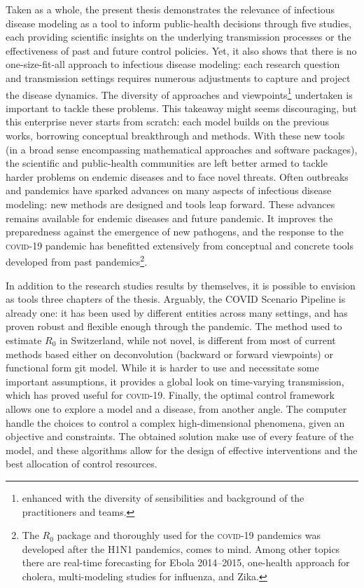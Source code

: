 Taken as a whole, the present thesis demonstrates the relevance of infectious disease modeling as a tool to inform public-health decisions through five studies, each providing scientific insights on the underlying transmission processes or the effectiveness of past and future control policies. Yet, it also shows that there is no one-size-fit-all approach to infectious disease modeling: each research question and transmission settings requires numerous adjustments to capture and project the disease dynamics. The diversity of approaches and viewpoints\footnote{enhanced with the diversity of sensibilities and background of the practitioners and teams.} undertaken is important to tackle these problems. This takeaway might seems discouraging, but this enterprise never starts from scratch: each model builds on the previous works, borrowing conceptual breakthrough and methods. With these new tools (in a broad sense encompassing  mathematical approaches and software packages), the scientific and public-health communities are left better armed to tackle harder problems on endemic diseases and to face novel threats. Often outbreaks and pandemics have sparked advances on many aspects of infectious disease modeling: new methods are designed and tools leap forward. These advances remains available for endemic diseases and future pandemic. It improves the preparedness against the emergence of new pathogens, and the response to the \textsc{covid}-19 pandemic has benefitted extensively from conceptual and concrete tools developed from past pandemics\footnote{The $R_0$ package and thoroughly used for the \textsc{covid}-19 pandemics was developed after the H1N1 pandemics, comes to mind. Among other topics there are \eg real-time forecasting for Ebola 2014--2015, one-health approach for cholera, multi-modeling studies for influenza, and Zika.}. 
  
  In addition to the research studies results by themselves, it is possible to envision as tools three chapters of the thesis. Arguably, the COVID Scenario Pipeline is already one: it has been used by different entities across many settings, and has proven robust and flexible enough through the pandemic. The method used to estimate $R_0$ in Switzerland, while not novel, is different from most of current methods based either on deconvolution (backward or forward viewpoints) or functional form git model. While it is harder to use and necessitate some important assumptions, it provides a global look on time-varying transmission, which has proved useful for \textsc{covid}-19. %
Finally, the optimal control framework allows one to explore a model and a disease, from another angle. The computer handle the choices to control a complex high-dimensional  phenomena, given an objective and constraints. The obtained solution make use of every feature of the model, and these algorithms allow for the design of effective interventions and the best allocation of control resources.


